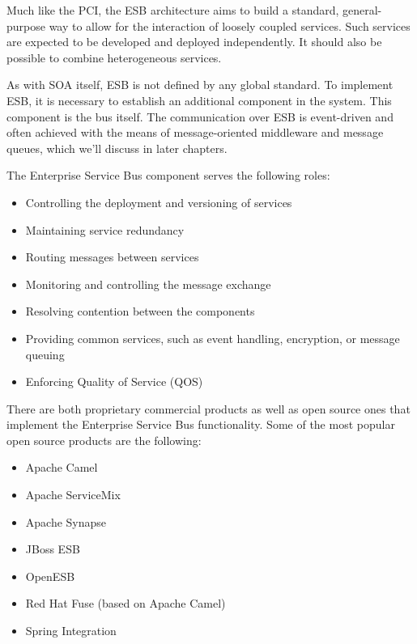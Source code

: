 Much like the PCI, the ESB architecture aims to build a standard, general-purpose way to allow for the interaction of loosely coupled services. Such services are expected to be developed and deployed independently. It should also be possible to combine heterogeneous services.

As with SOA itself, ESB is not defined by any global standard. To implement ESB, it is necessary to establish an additional component in the system. This component is the bus itself. The communication over ESB is event-driven and often achieved with the means of message-oriented middleware and message queues, which we'll discuss in later chapters.

The Enterprise Service Bus component serves the following roles:

\begin{itemize}
\item 
Controlling the deployment and versioning of services

\item 
Maintaining service redundancy

\item 
Routing messages between services

\item 
Monitoring and controlling the message exchange

\item 
Resolving contention between the components

\item 
Providing common services, such as event handling, encryption, or message queuing

\item 
Enforcing Quality of Service (QOS)
\end{itemize}

There are both proprietary commercial products as well as open source ones that implement the Enterprise Service Bus functionality. Some of the most popular open source products are the following:

\begin{itemize}
\item 
Apache Camel

\item 
Apache ServiceMix

\item 
Apache Synapse

\item 
JBoss ESB

\item 
OpenESB

\item 
Red Hat Fuse (based on Apache Camel)

\item 
Spring Integration
\end{itemize}

